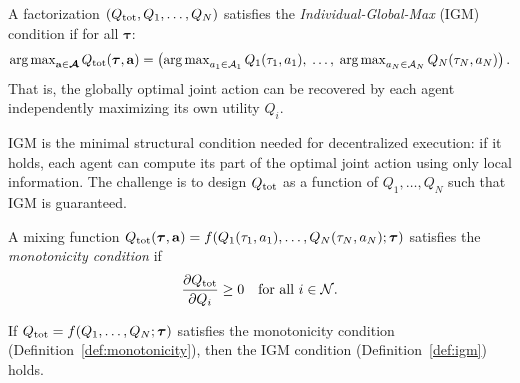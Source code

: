 \documentclass[11pt,a4paper]{article}
\begin{document}
\begin{definition}
\label{def:igm}
A factorization $(Q_{\mathrm{tot}}, Q_1, \ldots, Q_N)$ satisfies the
\emph{Individual-Global-Max} (IGM) condition if for all
$\boldsymbol{\tau}$:
\[
  \operatorname{arg\,max}_{\mathbf{a} \in \boldsymbol{\mathcal{A}}}
  Q_{\mathrm{tot}}(\boldsymbol{\tau}, \mathbf{a})
  = \left(
    \operatorname{arg\,max}_{a_1 \in \mathcal{A}_1} Q_1(\tau_1, a_1),\;
    \ldots,\;
    \operatorname{arg\,max}_{a_N \in \mathcal{A}_N} Q_N(\tau_N, a_N)
  \right).
\]
That is, the globally optimal joint action can be recovered by
each agent independently maximizing its own utility $Q_i$.
\end{definition}

IGM is the minimal structural condition needed for decentralized
execution: if it holds, each agent can compute its part of the
optimal joint action using only local information.  The challenge
is to design $Q_{\mathrm{tot}}$ as a function of $Q_1, \ldots, Q_N$ such
that IGM is guaranteed.

\begin{definition}
\label{def:monotonicity}
A mixing function $Q_{\mathrm{tot}}(\boldsymbol{\tau}, \mathbf{a}) =
f(Q_1(\tau_1, a_1), \ldots, Q_N(\tau_N, a_N); \boldsymbol{\tau})$
satisfies the \emph{monotonicity condition} if
\[
  \frac{\partial Q_{\mathrm{tot}}}{\partial Q_i} \geq 0
  \quad \text{for all } i \in \mathcal{N}.
\]
\end{definition}

\begin{proposition}
\label{prop:mono-igm}
If $Q_{\mathrm{tot}} = f(Q_1, \ldots, Q_N; \boldsymbol{\tau})$ satisfies
the monotonicity condition (Definition~\ref{def:monotonicity}),
then the IGM condition (Definition~\ref{def:igm}) holds.
\end{proposition}
\end{document}

